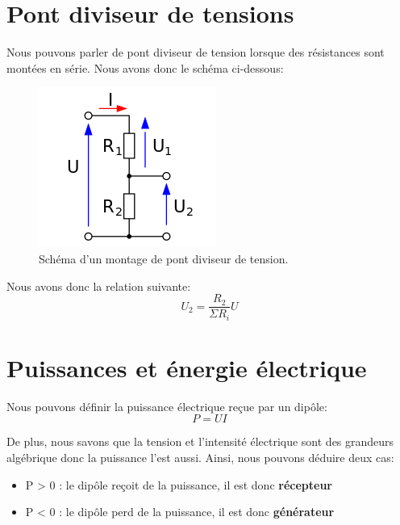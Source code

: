 \documentclass[12pt,a4paper,openany]{book}
\begin{document}
\newpage

\section{Pont diviseur de tensions}

Nous pouvons parler de pont diviseur de tension lorsque des résistances sont montées en série. Nous avons donc le schéma ci-dessous:
\begin{figure}[!h]
\begin{center}
\includegraphics[scale=1]{Images/pontDiviseurTension.png} 
\caption{Schéma d'un montage de pont diviseur de tension.}
\label{pontDiviseurTension}
\end{center}
\end{figure}

Nous avons donc la relation suivante:
\begin{equation}
U_{2} = \frac{R_{2}}{\Sigma R_{i}}U
\end{equation}

\section{Puissances et énergie électrique}

Nous pouvons définir la puissance électrique reçue par un dipôle:\\
\begin{equation}
P = UI
\label{relationPuissance}
\end{equation}

De plus, nous savons que la tension et l'intensité électrique sont des grandeurs algébrique donc la puissance l'est aussi. Ainsi, nous pouvons déduire deux cas:
\begin{itemize}
\item P > 0 : le dipôle reçoit de la puissance, il est donc \textbf{récepteur}
\item P < 0 : le dipôle perd de la puissance, il est donc \textbf{générateur}
\end{itemize}
\end{document}
